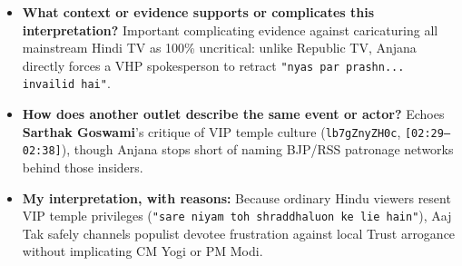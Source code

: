 \documentclass[10pt,a4paper]{article}
\begin{document}
\begin{itemize}[leftmargin=1.5em, itemsep=3pt, topsep=4pt]
  \item \textbf{What context or evidence supports or complicates this interpretation?} Important complicating evidence against caricaturing all mainstream Hindi TV as 100\% uncritical: unlike Republic TV, Anjana directly forces a VHP spokesperson to retract \texttt{"nyas par prashn... invailid hai"}.
  \item \textbf{How does another outlet describe the same event or actor?} Echoes \textbf{Sarthak Goswami}'s critique of VIP temple culture (\texttt{lb7gZnyZH0c}, \texttt{[02:29--02:38]}), though Anjana stops short of naming BJP/RSS patronage networks behind those insiders.
  \item \textbf{My interpretation, with reasons:} Because ordinary Hindu viewers resent VIP temple privileges (\texttt{"sare niyam toh shraddhaluon ke lie hain"}), Aaj Tak safely channels populist devotee frustration against local Trust arrogance without implicating CM Yogi or PM Modi.
\end{itemize}
\end{document}
